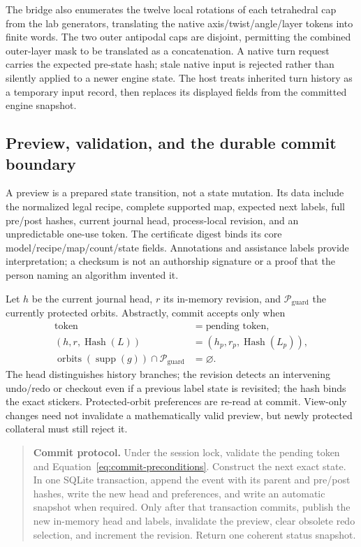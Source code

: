 \documentclass[a4paper,11pt]{article}
\begin{document}
The bridge also enumerates the twelve local rotations of each tetrahedral cap from the lab generators, translating the native axis/twist/angle/layer tokens into finite words. The two outer antipodal caps are disjoint, permitting the combined outer-layer mask to be translated as a concatenation. A native turn request carries the expected pre-state hash; stale native input is rejected rather than silently applied to a newer engine state. The host treats inherited turn history as a temporary input record, then replaces its displayed fields from the committed engine snapshot.

\subsection{Preview, validation, and the durable commit boundary}

A preview is a prepared state transition, not a state mutation. Its data include the normalized legal recipe, complete supported map, expected next labels, full pre/post hashes, current journal head, process-local revision, and an unpredictable one-use token. The certificate digest binds its core model/recipe/map/count/state fields. Annotations and assistance labels provide interpretation; a checksum is not an authorship signature or a proof that the person naming an algorithm invented it.

Let \(h\) be the current journal head, \(r\) its in-memory revision, and \(\mathcal P_{\mathrm{guard}}\) the currently protected orbits. Abstractly, commit accepts only when
\begin{equation}
\begin{aligned}
\text{token}&=\text{pending token},\\
(h,r,\operatorname{Hash}(L))&=(h_p,r_p,\operatorname{Hash}(L_p)),\\
\operatorname{orbits}(\operatorname{supp}(g))\cap\mathcal P_{\mathrm{guard}}&=\varnothing.
\end{aligned}
\label{eq:commit-preconditions}
\end{equation}
The head distinguishes history branches; the revision detects an intervening undo/redo or checkout even if a previous label state is revisited; the hash binds the exact stickers. Protected-orbit preferences are re-read at commit. View-only changes need not invalidate a mathematically valid preview, but newly protected collateral must still reject it.

\begin{quote}\small
\textbf{Commit protocol.}
Under the session lock, validate the pending token and Equation~\eqref{eq:commit-preconditions}. Construct the next exact state. In one SQLite transaction, append the event with its parent and pre/post hashes, write the new head and preferences, and write an automatic snapshot when required. Only after that transaction commits, publish the new in-memory head and labels, invalidate the preview, clear obsolete redo selection, and increment the revision. Return one coherent status snapshot.
\end{quote}
\end{document}
